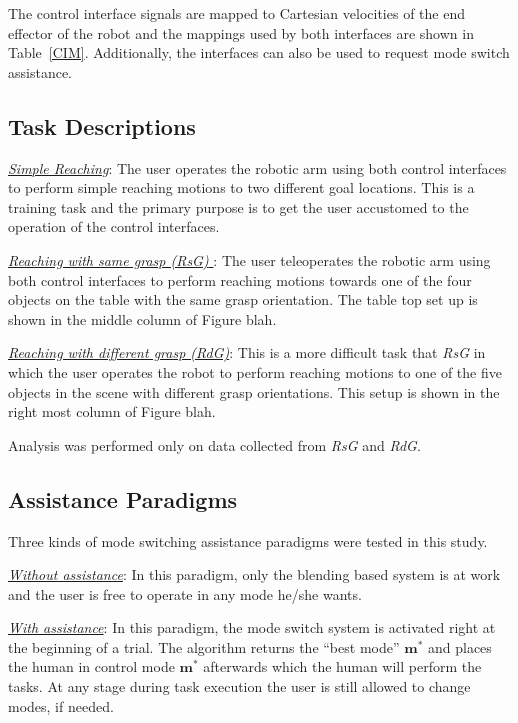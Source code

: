 \documentclass[conference]{IEEEtran}
\begin{document}
The control interface signals are mapped to Cartesian velocities of the end effector of the robot and the mappings used by both interfaces are shown in Table~\ref{CIM}. Additionally, the interfaces can also be used to request mode switch assistance. 

\subsection{Task Descriptions}
\noindent\underline{\textit{Simple Reaching}}: The user operates the robotic arm using both control interfaces to perform simple reaching motions to two different goal locations. This is a training task and the primary purpose is to get the user accustomed to the operation of the control interfaces. 

\noindent\underline{\textit{Reaching with same grasp (RsG)} }: The user teleoperates the robotic arm using both control interfaces to perform reaching motions towards one of the four objects on the table with the same grasp orientation. The table top set up is shown in the middle column of Figure blah. 

\noindent\underline{\textit{Reaching with different grasp (RdG)}}: This is a more difficult task that \textit{RsG} in which the user operates the robot to perform reaching motions to one of the five objects in the scene with different grasp orientations. This setup is shown in the right most column of Figure blah. 

Analysis was performed only on data collected from \textit{RsG} and \textit{RdG}. 

\subsection{Assistance Paradigms}
Three kinds of mode switching assistance paradigms were tested in this study. 

\noindent\underline{\textit{Without assistance}}: In this paradigm, only the blending based system is at work and the user is free to operate in any mode he/she wants. 

\noindent\underline{\textit{With assistance}}: In this paradigm, the mode switch system is activated right at the beginning of a trial. The algorithm returns the ``best mode'' $\boldsymbol{m}^*$ and places the human in control mode $\boldsymbol{m}^*$ afterwards which the human will perform the tasks. At any stage during task execution the user is still allowed to change modes, if needed. 
\end{document}
